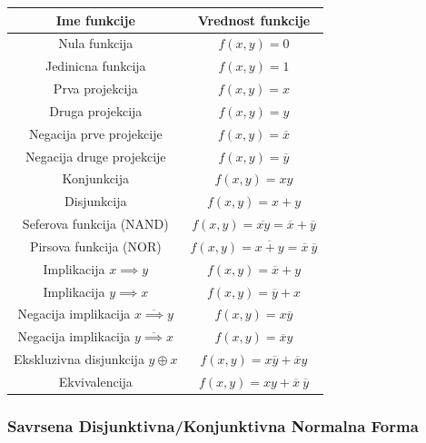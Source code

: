 \documentclass[12p,a4paper]{article}
\begin{document}
\begin{multicols}{2}
    \begin{tabular}{*{2}{c}}
        Ime funkcije                                    & Vrednost funkcije \\
        \midrule
        Nula funkcija                                   & $f(x, y) = 0$ \\
        Jedinicna funkcija                              & $f(x, y) = 1$ \\
        Prva projekcija                                 & $f(x, y) = x$ \\
        Druga projekcija                                & $f(x, y) = y$ \\
        Negacija prve projekcije                        & $f(x, y) = \overline{x}$ \\
        Negacija druge projekcije                       & $f(x, y) = \overline{y}$ \\
        Konjunkcija                                     & $f(x, y) = x y$ \\
        Disjunkcija                                     & $f(x, y) = x + y$ \\
        Seferova funkcija (NAND)                        & $f(x, y) = \overline{xy} = \overline{x} + \overline{y}$ \\
        Pirsova funkcija (NOR)                          & $f(x, y) = \overline{x + y} = \overline{x} \ \overline{y}$ \\
        Implikacija $x \implies y$                      & $f(x, y) = \overline{x} + y$ \\
        Implikacija $y \implies x$                      & $f(x, y) = \overline{y} + x$ \\
        Negacija implikacija $\overline{x \implies y}$  & $f(x, y) = x \overline{y}$ \\
        Negacija implikacija $\overline{y \implies x}$  & $f(x, y) = \overline{x} y$ \\
        Ekskluzivna disjunkcija $y \oplus x$            & $f(x, y) = x \overline{y} + \overline{x} y$ \\
        Ekvivalencija                                   & $f(x, y) = x y + \overline{x} \ \overline{y}$ \\
    \end{tabular}

    \subsubsection{Savrsena Disjunktivna/Konjunktivna Normalna Forma}


\end{multicols}
\end{document}
